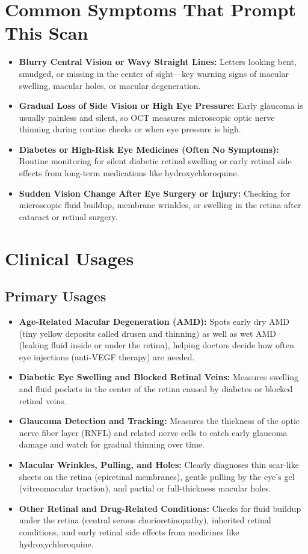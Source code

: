 \section{Common Symptoms That Prompt This Scan}
\begin{itemize}
\item \textbf{Blurry Central Vision or Wavy Straight Lines:} Letters looking bent, smudged, or missing in the center of sight---key warning signs of macular swelling, macular holes, or macular degeneration.
\item \textbf{Gradual Loss of Side Vision or High Eye Pressure:} Early glaucoma is usually painless and silent, so OCT measures microscopic optic nerve thinning during routine checks or when eye pressure is high.
\item \textbf{Diabetes or High-Risk Eye Medicines (Often No Symptoms):} Routine monitoring for silent diabetic retinal swelling or early retinal side effects from long-term medications like hydroxychloroquine.
\item \textbf{Sudden Vision Change After Eye Surgery or Injury:} Checking for microscopic fluid buildup, membrane wrinkles, or swelling in the retina after cataract or retinal surgery.
\end{itemize}

\section{Clinical Usages}

\subsection{Primary Usages}
\begin{itemize}
\item \textbf{Age-Related Macular Degeneration (AMD):} Spots early dry AMD (tiny yellow deposits called drusen and thinning) as well as wet AMD (leaking fluid inside or under the retina), helping doctors decide how often eye injections (anti-VEGF therapy) are needed.
\item \textbf{Diabetic Eye Swelling and Blocked Retinal Veins:} Measures swelling and fluid pockets in the center of the retina caused by diabetes or blocked retinal veins.
\item \textbf{Glaucoma Detection and Tracking:} Measures the thickness of the optic nerve fiber layer (RNFL) and related nerve cells to catch early glaucoma damage and watch for gradual thinning over time.
\item \textbf{Macular Wrinkles, Pulling, and Holes:} Clearly diagnoses thin scar-like sheets on the retina (epiretinal membranes), gentle pulling by the eye's gel (vitreomacular traction), and partial or full-thickness macular holes.
\item \textbf{Other Retinal and Drug-Related Conditions:} Checks for fluid buildup under the retina (central serous chorioretinopathy), inherited retinal conditions, and early retinal side effects from medicines like hydroxychloroquine.
\end{itemize}

